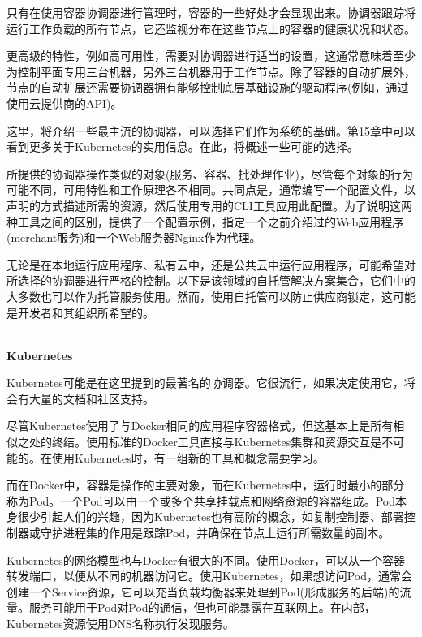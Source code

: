 
只有在使用容器协调器进行管理时，容器的一些好处才会显现出来。协调器跟踪将运行工作负载的所有节点，它还监视分布在这些节点上的容器的健康状况和状态。

更高级的特性，例如高可用性，需要对协调器进行适当的设置，这通常意味着至少为控制平面专用三台机器，另外三台机器用于工作节点。除了容器的自动扩展外，节点的自动扩展还需要协调器拥有能够控制底层基础设施的驱动程序(例如，通过使用云提供商的API)。

这里，将介绍一些最主流的协调器，可以选择它们作为系统的基础。第15章中可以看到更多关于Kubernetes的实用信息。在此，将概述一些可能的选择。

所提供的协调器操作类似的对象(服务、容器、批处理作业)，尽管每个对象的行为可能不同，可用特性和工作原理各不相同。共同点是，通常编写一个配置文件，以声明的方式描述所需的资源，然后使用专用的CLI工具应用此配置。为了说明这两种工具之间的区别，提供了一个配置示例，指定一个之前介绍过的Web应用程序(merchant服务)和一个Web服务器Nginx作为代理。


无论是在本地运行应用程序、私有云中，还是公共云中运行应用程序，可能希望对所选择的协调器进行严格的控制。以下是该领域的自托管解决方案集合，它们中的大多数也可以作为托管服务使用。然而，使用自托管可以防止供应商锁定，这可能是开发者和其组织所希望的。

\hspace*{\fill} \\ %
\noindent
\textbf{Kubernetes}

Kubernetes可能是在这里提到的最著名的协调器。它很流行，如果决定使用它，将会有大量的文档和社区支持。

尽管Kubernetes使用了与Docker相同的应用程序容器格式，但这基本上是所有相似之处的终结。使用标准的Docker工具直接与Kubernetes集群和资源交互是不可能的。在使用Kubernetes时，有一组新的工具和概念需要学习。

而在Docker中，容器是操作的主要对象，而在Kubernetes中，运行时最小的部分称为Pod。一个Pod可以由一个或多个共享挂载点和网络资源的容器组成。Pod本身很少引起人们的兴趣，因为Kubernetes也有高阶的概念，如复制控制器、部署控制器或守护进程集的作用是跟踪Pod，并确保在节点上运行所需数量的副本。

Kubernetes的网络模型也与Docker有很大的不同。使用Docker，可以从一个容器转发端口，以便从不同的机器访问它。使用Kubernetes，如果想访问Pod，通常会创建一个Service资源，它可以充当负载均衡器来处理到Pod(形成服务的后端)的流量。服务可能用于Pod对Pod的通信，但也可能暴露在互联网上。在内部，Kubernetes资源使用DNS名称执行发现服务。

